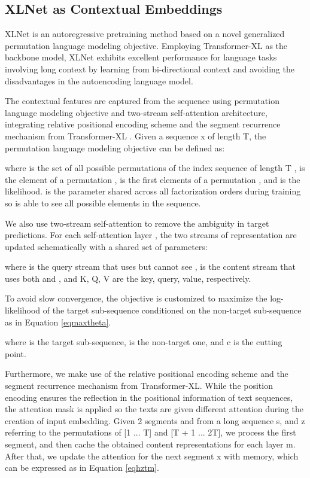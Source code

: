 \documentclass[runningheads]{llncs}
\begin{document}
\subsection{XLNet as Contextual Embeddings}
XLNet is an autoregressive pretraining method based on a novel generalized permutation language modeling objective. Employing Transformer-XL as the backbone model, XLNet exhibits excellent performance for language tasks involving long context by learning from bi-directional context and avoiding the disadvantages in the autoencoding language model.

The contextual features are captured from the sequence using permutation language modeling objective and two-stream self-attention architecture, integrating relative positional encoding scheme and the segment recurrence mechanism from Transformer-XL \cite{yang2019xlnet}. Given a sequence x of length T, the permutation language modeling objective can be defined as: 


where  is the set of all possible permutations of the index sequence of length T 
,  is the  element of a permutation ,   is the first  elements of a permutation , and   is the likelihood.  is the parameter shared across all factorization orders during training so  is able to see all  possible elements in the sequence.

We also use two-stream self-attention to remove the ambiguity in target predictions. For each self-attention layer  , the two streams of representation are updated schematically with a shared set of parameters:


where   is the query stream that uses  but cannot see ,  is the content stream that uses both  and , and K, Q, V are the key, query, value, respectively.

To avoid slow convergence,  the objective is customized to maximize the log-likelihood of the target sub-sequence conditioned on the non-target sub-sequence as in Equation \ref{eqmaxtheta}.

{\small

}
where  is the target sub-sequence,  is the non-target one, and c is the cutting point.

Furthermore, we make use of the relative positional encoding scheme and the segment recurrence mechanism from Transformer-XL. 
While the position encoding ensures the reflection in the positional information of text sequences, the attention mask is applied so the texts are given different attention during the creation of input embedding. 
Given 2 segments  and  from a long sequence s,
 and z referring to the permutations of [1 ... T] and [T + 1 ... 2T], we process the first segment, and then cache the obtained content representations  for each layer m. After that, we update the attention for the next segment x with memory, which can be expressed as in Equation \ref{eqhztm}.
\end{document}
